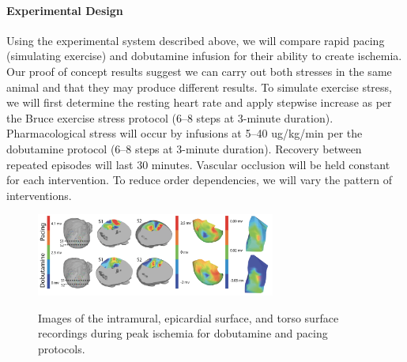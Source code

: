 

\paragraph{Experimental Design} Using the experimental system described
above, we will compare rapid pacing (simulating exercise) and dobutamine infusion for their
ability to create ischemia. Our proof of concept results suggest we can
carry out both stresses in the same animal and that they may produce
different results.  To simulate exercise stress, we will first determine
the resting heart rate and apply stepwise increase as per the Bruce
exercise stress protocol (6--8 steps at 3-minute
duration).\cite{BLZ:Oki1986} Pharmacological stress will occur by infusions
at 5--40 ug/kg/min per the dobutamine protocol (6--8 steps at 3-minute
duration).\cite{BLZ:SAL1992} Recovery between repeated episodes will last
30 minutes. Vascular occlusion will be held constant for each
intervention. To reduce order dependencies, we will vary the pattern of
interventions.


\begin{figure}
    \vspace{-.3in}
    \begin{center}
        {\includegraphics[width=0.7\textwidth]
          {Figures/fig2.png}}
        \captionsetup{width = 0.7\textwidth}
        \caption{\small \label{fig:dobutvspacing} Images of the
          intramural, epicardial surface, and torso surface recordings
          during peak ischemia for dobutamine and pacing protocols.}
    \end{center}
    \vspace{-.25in}
\end{figure}


